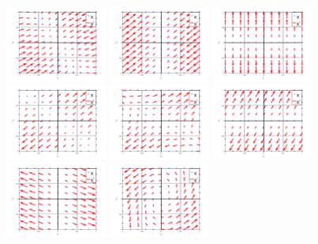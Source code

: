 \documentclass[12pt,a4paper]{article}
\begin{document}
    
    \includegraphics[width=0.25\textwidth]{A/1.png}
    \includegraphics[width=0.25\textwidth]{A/2.png}
    \includegraphics[width=0.25\textwidth]{A/3.png}
    \includegraphics[width=0.25\textwidth]{A/4.png}
    \includegraphics[width=0.25\textwidth]{A/5.png}
    \includegraphics[width=0.25\textwidth]{A/6.png}
    \includegraphics[width=0.25\textwidth]{A/7.png}
    \includegraphics[width=0.25\textwidth]{A/8.png}
\end{document}
